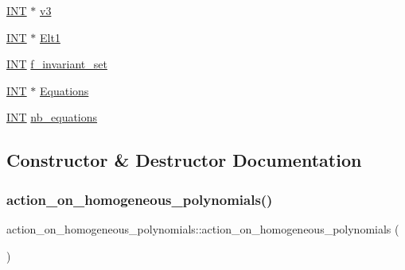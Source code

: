 \begin{DoxyCompactItemize}
\item 
\mbox{\hyperlink{galois_8h_a09fddde158a3a20bd2dcadb609de11dc}{I\+NT}} $\ast$ \mbox{\hyperlink{classaction__on__homogeneous__polynomials_aca3bb063166c047cc31367285efe4358}{v3}}
\item 
\mbox{\hyperlink{galois_8h_a09fddde158a3a20bd2dcadb609de11dc}{I\+NT}} $\ast$ \mbox{\hyperlink{classaction__on__homogeneous__polynomials_a38f1d447262adecdb9fe74fd48d1310a}{Elt1}}
\item 
\mbox{\hyperlink{galois_8h_a09fddde158a3a20bd2dcadb609de11dc}{I\+NT}} \mbox{\hyperlink{classaction__on__homogeneous__polynomials_adaee8a53b9237a0d5530d45ffd46d652}{f\+\_\+invariant\+\_\+set}}
\item 
\mbox{\hyperlink{galois_8h_a09fddde158a3a20bd2dcadb609de11dc}{I\+NT}} $\ast$ \mbox{\hyperlink{classaction__on__homogeneous__polynomials_af06a5a4be82cb6e293c208dafd0a4a47}{Equations}}
\item 
\mbox{\hyperlink{galois_8h_a09fddde158a3a20bd2dcadb609de11dc}{I\+NT}} \mbox{\hyperlink{classaction__on__homogeneous__polynomials_ae5660ab14ba177d555d60fdcc7af6f04}{nb\+\_\+equations}}
\end{DoxyCompactItemize}


\subsection{Constructor \& Destructor Documentation}
\mbox{\label{classaction__on__homogeneous__polynomials_a371c102746788023d4b1baa4db1ec98d}} 
\subsubsection{\texorpdfstring{action\+\_\+on\+\_\+homogeneous\+\_\+polynomials()}{action\_on\_homogeneous\_polynomials()}}
{\footnotesize\ttfamily action\+\_\+on\+\_\+homogeneous\+\_\+polynomials\+::action\+\_\+on\+\_\+homogeneous\+\_\+polynomials (\begin{DoxyParamCaption}{ }\end{DoxyParamCaption})}

